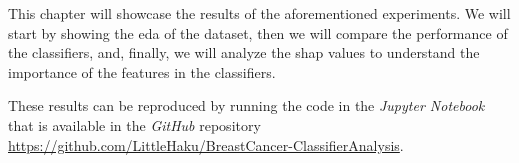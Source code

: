 This chapter will showcase the results of the aforementioned experiments. We will start by showing the \acl{eda} of the dataset, then we will compare the performance of the classifiers, and, finally, we will analyze the \ac{shap} values to understand the importance of the features in the classifiers.

These results can be reproduced by running the code in the \textit{Jupyter Notebook} that is available in the \textit{GitHub} repository \href{https://github.com/LittleHaku/BreastCancer-ClassifierAnalysis}{https://github.com/LittleHaku/BreastCancer-ClassifierAnalysis}.